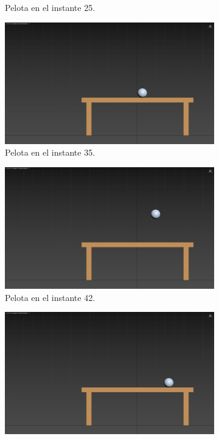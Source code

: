 \documentclass{article}
\begin{document}
\begin{figure}[H]
\begin{subfigure}[H]{0.48\textwidth}
        \caption{Pelota en el instante 25.}
    \end{subfigure}
    \hfill
    \begin{subfigure}[H]{0.48\textwidth}
        \centering
        \includegraphics[width=\textwidth]{imagenes/Ejercicio3/keyframes/35.png}
        \caption{Pelota en el instante 35.}
    \end{subfigure}
    \par\bigskip
    \begin{subfigure}[H]{0.48\textwidth}
        \centering
        \includegraphics[width=\textwidth]{imagenes/Ejercicio3/keyframes/42.png}
        \caption{Pelota en el instante 42.}
    \end{subfigure}
    \hfill
    \begin{subfigure}[H]{0.48\textwidth}
        \centering
        \includegraphics[width=\textwidth]{imagenes/Ejercicio3/keyframes/49.png}

\end{subfigure}
\end{figure}
\end{document}
